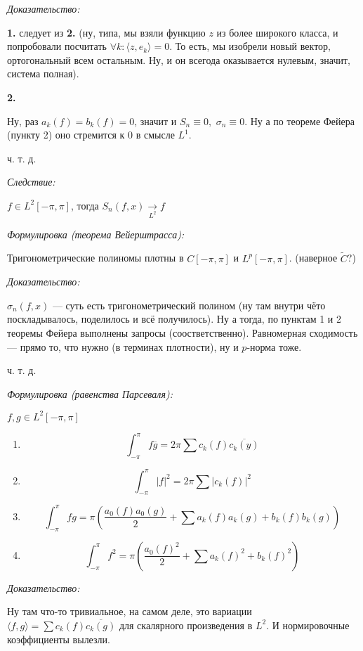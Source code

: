 \documentclass{article}
\def\dbl{\,\,}
\def\goesto#1{\underset{#1}{\longrightarrow}}
\def\sk#1#2{\langle #1, #2 \rangle}
\begin{document}
\textit{Доказательство:}

\textbf{1.} следует из \textbf{2.} (ну, типа, мы взяли функцию $z$ из более широкого класса, и попробовали посчитать $\forall k: \sk{z}{e_k} = 0$. То есть, мы изобрели новый вектор, ортогональный всем остальным. Ну, и он всегода оказывается нулевым, значит, система полная).

\textbf{2.}

Ну, раз $a_k(f) = b_k(f) = 0$, значит и $S_n \equiv 0, \dbl \sigma_n \equiv 0$. Ну а по теореме Фейера (пункту 2) оно стремится к $0$ в смысле $L^1$. 

ч. т. д. 

\textit{Следствие: }

$f \in L^2[-\pi, \pi]$, тогда $S_n(f, x) \goesto{L^2} f$

\textit{Формулировка (теорема Вейерштрасса):}

Тригонометрические полиномы плотны в $C[-\pi, \pi]$ и $L^p[-\pi, \pi]$. (наверное $\tilde{C}$?)

\textit{Доказательство:}

$\sigma_n(f, x)$ --- суть есть тригонометрический полином (ну там внутри чёто поскладывалось, поделилось и всё получилось). Ну а тогда, по пунктам 1 и 2 теоремы Фейера выполнены запросы (соостветственно). Равномерная сходимость --- прямо то, что нужно (в терминах плотности), ну и $p$-норма тоже.

ч. т. д. 

\textit{Формулировка (равенства Парсеваля):}

$f, g \in L^2[-\pi, \pi]$

\begin{enumerate}
    \item \[\int_{-\pi}^{\pi} f \overline{g} = 2\pi \sum c_k(f) \overline{c_k(y)}\]
    \item \[\int_{-\pi}^{\pi} |f|^2 = 2\pi \sum |c_k(f)|^2\]
    \item \[\int_{-\pi}^{\pi} fg = \pi \left(\frac{a_0(f)a_0(g)}{2} + \sum a_k(f)a_k(g) + b_k(f)b_k(g)\right)\]
    \item \[\int_{-\pi}^{\pi} f^2 = \pi \left( \frac{a_0(f)^2}{2} + \sum a_k(f)^2 + b_k(f)^2 \right)\]
\end{enumerate}

\textit{Доказательство:}

Ну там что-то тривиальное, на самом деле, это вариации $\sk{f}{g} = \sum c_k(f) \overline{c_k(g)}$ для скалярного произведения в $L^2$. И нормировочные коэффициенты вылезли.
\end{document}
